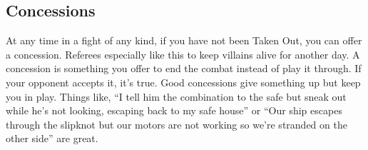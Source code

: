 \vfil\subsection{Concessions}\label{sec:Concessions} %

At any time in a fight of any kind, if you have not been Taken Out, you can offer a concession. Referees especially like this to keep villains alive for another day. A concession is something you offer to end the combat instead of play it through. If your opponent accepts it, it's true. Good concessions give something up but keep you in play. Things like, ``I tell him the combination to the safe but sneak out while he's not looking, escaping back to my safe house'' or ``Our ship escapes through the slipknot but our motors are not working so we're stranded on the other side'' are great.

